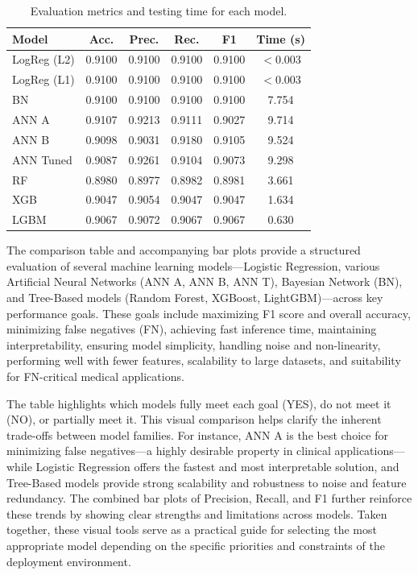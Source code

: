 \documentclass[conference]{IEEEtran}
\begin{document}
\vspace{4em}
\begin{table}[H]
\caption{Evaluation metrics and testing time for each model.}
\centering
\label{tab:performance_metrics}
\renewcommand{\arraystretch}{1.2}
\begin{tabular}{|l|c|c|c|c|c|}
\hline
\textbf{Model} & \textbf{Acc.} & \textbf{Prec.} & \textbf{Rec.} & \textbf{F1} & \textbf{Time (s)} \\
\hline
LogReg (L2) & 0.9100 & 0.9100 & 0.9100 & 0.9100 & $<$0.003 \\
LogReg (L1) & 0.9100 & 0.9100 & 0.9100 & 0.9100 & $<$0.003 \\
BN          & 0.9100 & 0.9100 & 0.9100 & 0.9100 & 7.754 \\
ANN A       & 0.9107 & 0.9213 & 0.9111 & 0.9027 & 9.714 \\
ANN B       & 0.9098 & 0.9031 & 0.9180 & 0.9105 & 9.524 \\
ANN Tuned   & 0.9087 & 0.9261 & 0.9104 & 0.9073 & 9.298 \\
RF          & 0.8980 & 0.8977 & 0.8982 & 0.8981 & 3.661 \\
XGB         & 0.9047 & 0.9054 & 0.9047 & 0.9047 & 1.634 \\
LGBM        & 0.9067 & 0.9072 & 0.9067 & 0.9067 & 0.630 \\
\hline
\end{tabular}
\end{table}



The comparison table and accompanying bar plots provide a structured evaluation of several machine learning models—Logistic Regression, various Artificial Neural Networks (ANN A, ANN B, ANN T), Bayesian Network (BN), and Tree-Based models (Random Forest, XGBoost, LightGBM)—across key performance goals. These goals include maximizing F1 score and overall accuracy, minimizing false negatives (FN), achieving fast inference time, maintaining interpretability, ensuring model simplicity, handling noise and non-linearity, performing well with fewer features, scalability to large datasets, and suitability for FN-critical medical applications.

The table highlights which models fully meet each goal (YES), do not meet it (NO), or partially meet it. This visual comparison helps clarify the inherent trade-offs between model families. For instance, ANN A is the best choice for minimizing false negatives—a highly desirable property in clinical applications—while Logistic Regression offers the fastest and most interpretable solution, and Tree-Based models provide strong scalability and robustness to noise and feature redundancy. The combined bar plots of Precision, Recall, and F1 further reinforce these trends by showing clear strengths and limitations across models. Taken together, these visual tools serve as a practical guide for selecting the most appropriate model depending on the specific priorities and constraints of the deployment environment.
\end{document}
